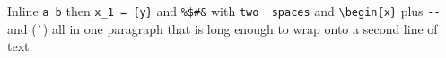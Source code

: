 \documentclass{article}
\begin{document}
Inline \verb|a b| then \verb+x_1 = {y}+ and \verb!%$#&! with
\verb*|two  spaces| and \verb=\begin{x}= plus \verb"--" and (\verb|`|)
all in one paragraph that is long enough to wrap onto a second line of text.
\end{document}
